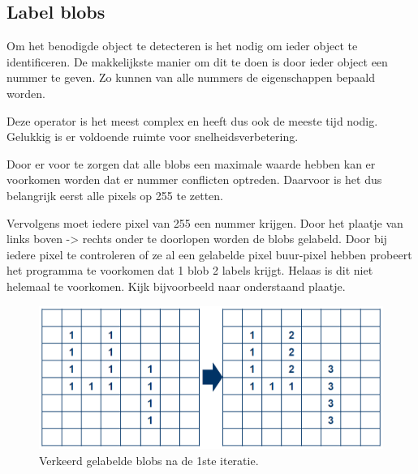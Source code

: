 \subsection{Label blobs}
\label{sec:labelblobs}
Om het benodigde object te detecteren is het nodig om ieder object te 
identificeren. De makkelijkste manier om dit te doen is door ieder object een 
nummer te geven. Zo kunnen van alle nummers de eigenschappen bepaald worden. 

Deze operator is het meest complex en heeft dus ook de meeste tijd nodig. 
Gelukkig is er voldoende ruimte voor snelheidsverbetering.

Door er voor te zorgen dat alle blobs een maximale waarde hebben kan er voorkomen 
worden dat er nummer conflicten optreden. Daarvoor is het dus belangrijk eerst 
alle pixels op 255 te zetten.

Vervolgens moet iedere pixel van 255 een nummer krijgen. Door het plaatje van 
links boven -> rechts onder te doorlopen worden de blobs gelabeld. Door bij 
iedere pixel te controleren of ze al een gelabelde pixel buur-pixel hebben 
probeert het programma te voorkomen dat 1 blob 2 labels krijgt. Helaas is dit 
niet helemaal te voorkomen. Kijk bijvoorbeeld naar onderstaand plaatje.

\begin{figure}
    \begin{center}
        \includegraphics[scale=0.5]{figures/label_blobs_step1.png}
    \end{center}
    \caption{Verkeerd gelabelde blobs na de 1ste iteratie.}
    \label{fig:lbstep1}
\end{figure}

